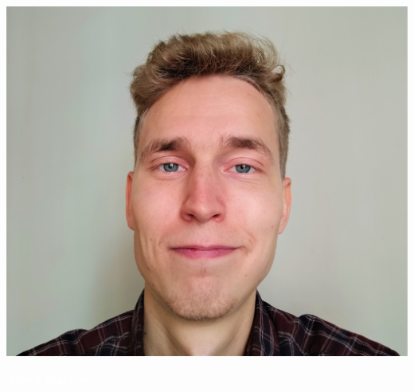 \documentclass[10pt]{article}
\newcommand{\mpwidth}{\linewidth-\fboxsep-\fboxsep}
\begin{document}
\setlength{\columnsep}{2.2em}
\setlength{\columnseprule}{4pt}

\begin{paracol}{2}
\begin{leftcolumn}
 \includegraphics[width=\linewidth]{CV_kuva.jpg}


 \vspace{2mm}
 \colorbox{darkcol}{
 \begin{minipage}[c][1cm][c]{.97\mpwidth}
  \begin{center}
   \LARGE{
	\textbf{
	 \textcolor{white}{Akseli Ingervo}
	}
   }
  \end{center}
 \end{minipage}
 }



\end{leftcolumn}
\end{paracol}
\end{document}
